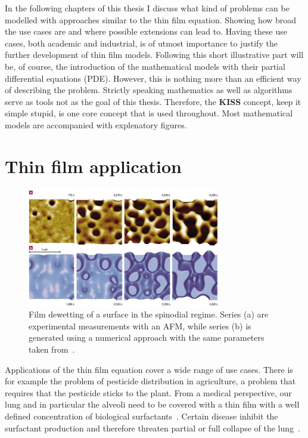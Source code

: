 In the following chapters of this thesis I discuss what kind of problems can be modelled with approaches similar to the thin film equation.
Showing how broad the use cases are and where possible extensions can lead to.
Having these use cases, both academic and industrial, is of utmost importance to justify the further development of thin film models. 
Following this short illustrative part will be, of course, the introduction of the mathematical models with their partial differential equations (PDE). 
However, this is nothing more than an efficient way of describing the problem.
Strictly speaking mathematics as well as algorithms serve as tools not as the goal of this thesis. 
Therefore, the \textbf{KISS} concept, keep it simple stupid, is one core concept that is used throughout.
Most mathematical models are accompanied with explenatory figures.        

\section{Thin film application}
\label{section:applications}
\begin{figure}
    \centering
    \includegraphics[width=0.75\textwidth]{graphics/41563_2003_Article_BFnmat788_Fig1_HTML.png}
    \caption{Film dewetting of a surface in the spinodial regime.
    Series (a) are experimental measurements with an AFM, while series (b) is generated using a numerical approach with the same parameters taken from~\cite{beckerComplexDewettingScenarios2003}.}
    \label{fig:becker_dewetting}
\end{figure}
Applications of the thin film equation cover a wide range of use cases. 
There is for example the problem of pesticide distribution in agriculture, a problem that requires that the pesticide sticks to the plant.
From a medical perspective, our lung and in particular the alveoli need to be covered with a thin film with a well defined concentration of biological surfactants~\cite{hermansLungSurfactantsDifferent2015}.
Certain disease inhibit the surfactant production and therefore threaten partial or full collapse of the lung~\cite{doi:10.1146/annurev.fl.26.010194.002525}.


